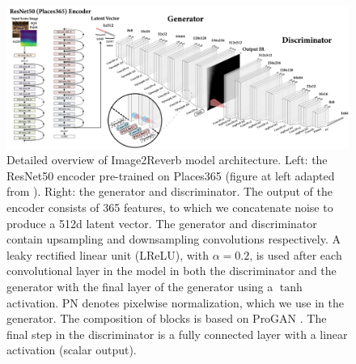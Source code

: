 \begin{figure}[!hb]
    \centering
    \includegraphics[width=\textwidth]{nn_arch.png}
    \caption{Detailed overview of Image2Reverb model architecture. Left: the ResNet50 encoder pre-trained on Places365 (figure at left adapted from \cite{he2016deep}). Right: the generator and discriminator. The output of the encoder consists of 365 features, to which we concatenate noise to produce a 512d latent vector. The generator and discriminator contain upsampling and downsampling convolutions respectively. A leaky rectified linear unit (LReLU), with $\alpha=0.2$, is used after each convolutional layer in the model in both the discriminator and the generator with the final layer of the generator using a $\tanh$ activation. PN denotes pixelwise normalization, which we use in the generator. The composition of blocks is based on ProGAN \cite{karras2018progressive}. The final step in the discriminator is a fully connected layer with a linear activation (scalar output).}
    \label{fig:nn_arch}
\end{figure}

